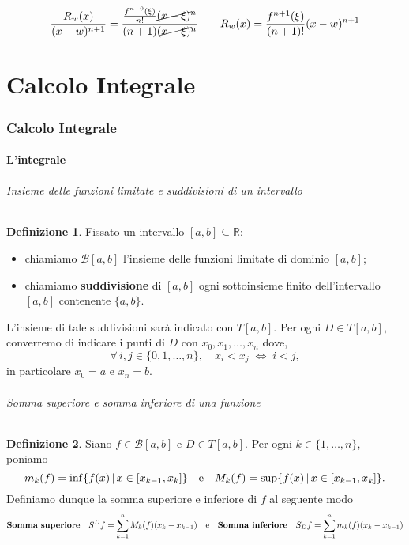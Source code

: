 \documentclass{article}
\theoremstyle{plain}
\theoremstyle{definition}
\newtheorem{defn}{Definizione}[section]
\theoremstyle{remark}
\begin{document}
\[\dfrac{R_w(x)}{(x-w)^{n+1}}=\dfrac{\frac{f^{n+0}(\xi)}{n!}\cancel{(x-\xi)}^n}{(n+1)\cancel{(x-\xi)}^n}\quad\quad R_w(x)=\dfrac{f^{n+1}(\xi)}{(n+1)!}(x-w)^{n+1}\]





\vspace{50pt}
\part{Calcolo Integrale}
\vspace{50pt}
\section{Calcolo Integrale}
\vspace{50pt}

\subsection{L'integrale}

\vspace{10pt}

\paragraph{Insieme delle funzioni limitate e suddivisioni di un intervallo}
\begin{bxthm}
\begin{defn}
Fissato un intervallo $[a,b]\subseteq\mathbb{R}$:
\begin{itemize}
    \item chiamiamo $\mathcal{B}[a,b]$ l'insieme delle funzioni limitate di dominio $[a,b]$;
    \item chiamiamo \textbf{suddivisione} di $[a,b]$ ogni sottoinsieme finito dell'intervallo $[a,b]$ contenente $\{a,b\}$.
\end{itemize}
L'insieme di tale suddivisioni sarà indicato con $T[a,b]$. 
Per ogni $D\in T[a,b]$, converremo di indicare i punti di $D$ con $x_0,x_1,\dots,x_n$ dove, 
\[\forall\,i,j\in\{0,1,\dots,n\},\quad x_i<x_j\;\iff\; i<j,\]
in particolare $x_0=a$ e $x_n=b$. 
\end{defn}
\end{bxthm}

\vspace{10pt}

\paragraph{Somma superiore e somma inferiore di una funzione}
\begin{bxthm}
\begin{defn}
Siano $f\in \mathcal{B}[a,b]$ e $D\in T[a,b]$. Per ogni $k\in\{1,\dots,n\}$, poniamo 
\[m_k(f)=\inf\{f(x)\,|\,x\in[x_{k-1},x_k]\}\quad\textup{e}\quad M_k(f)=\sup\{f(x)\,|\,x\in[x_{k-1},x_k]\}.\]
Definiamo dunque la somma superiore e inferiore di $f$ al seguente modo
\[\textbf{Somma superiore}\quad S^Df=\sum_{k=1}^{n}M_k(f)(x_{k}-x_{k-1}) \quad\textup{e}\quad \textbf{Somma inferiore}\quad S_Df=\sum_{k=1}^{n}m_k(f)(x_{k}-x_{k-1}) \]        
\end{defn}
\end{bxthm}
\end{document}
